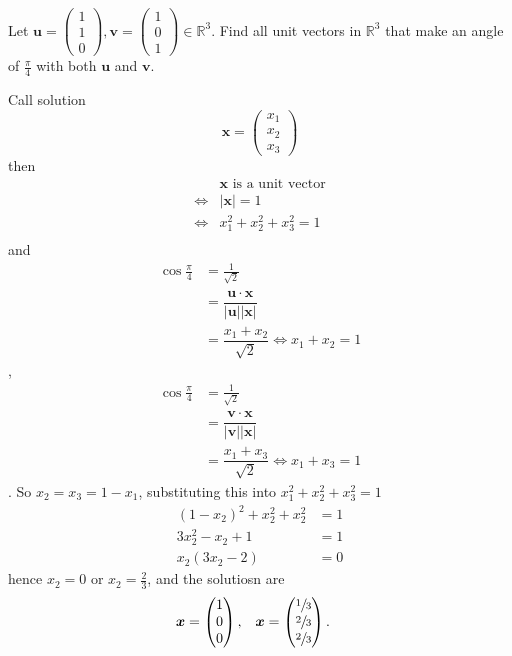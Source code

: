 \begin{example}
    Let
    $
        \bm u=
        \begin{pmatrix}
            1\\1\\0
        \end{pmatrix}
        ,\bm v=
        \begin{pmatrix}
            1\\0\\1
        \end{pmatrix}
        \in\mathbb R^3.
    $
    Find all unit vectors in $\mathbb R^3$ that make an angle of $\frac\pi 4$ with both $\bm u$ and $\bm v$.
    
    Call solution
    \[
        \bm x=
        \begin{pmatrix}
            x_1\\x_2\\x_3
        \end{pmatrix}
    \]
    then
    \begin{align*}
        &\bm x\text{ is a unit vector}\\
        \iff&|\bm x|=1\\
        \iff&x_1^2+x_2^2+x_3^2=1\\
    \end{align*}
    and
    \begin{align*}
        \cos{\frac\pi 4}&=\frac1{\sqrt2}\\
        &=\dfrac{\bm u\cdot \bm x}{|\bm u||\bm x|}\\
        &=\dfrac{x_1+x_2}{\sqrt2}\iff x_1+x_2=1
    \end{align*},
    \begin{align*}
        \cos{\frac\pi 4}&=\frac1{\sqrt2}\\
        &=\dfrac{\bm v\cdot \bm x}{|\bm v||\bm x|}\\
        &=\dfrac{x_1+x_3}{\sqrt2}\iff x_1+x_3=1
    \end{align*}.
    So $x_2=x_3=1-x_1$, substituting this into $x_1^2+x_2^2+x_3^2=1$
    \begin{align*}
        (1-x_2)^2+x_2^2+x_2^2&=1\\
        3x_2^2-x_2+1&=1\\
        x_2(3x_2-2)&=0
    \end{align*}
    hence $x_2=0$ or $x_2=\frac23$, and the solutiosn are
    \begin{align*}
        \bm x&=
        \begin{pmatrix}
            1\\0\\0
        \end{pmatrix}
        ,&\bm x&=
        \begin{pmatrix}
            \sfrac13\\\sfrac23\\\sfrac23
        \end{pmatrix}
        .
    \end{align*}
\end{example}

